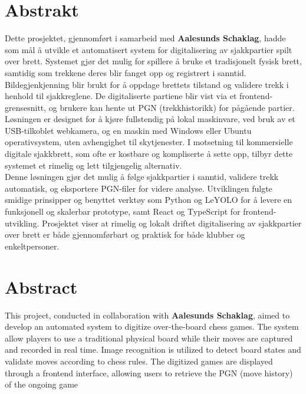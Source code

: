 \chapter*{Abstrakt}

Dette prosjektet, gjennomført i samarbeid med \textbf{Aalesunds Schaklag}, hadde som mål å utvikle et automatisert system for digitalisering av sjakkpartier spilt over brett. Systemet gjør det mulig for spillere å bruke et tradisjonelt fysisk brett, samtidig som trekkene deres blir fanget opp og registrert i sanntid. Bildegjenkjenning blir brukt for å oppdage brettets tilstand og validere trekk i henhold til sjakkreglene. De digitaliserte partiene blir vist via et frontend-grensesnitt, og brukere kan hente ut PGN (trekkhistorikk) for pågående partier. \\

Løsningen er designet for å kjøre fullstendig på lokal maskinvare, ved bruk av et USB-tilkoblet webkamera, og en maskin med Windows eller Ubuntu operativsystem, uten avhengighet til skytjenester. I motsetning til kommersielle digitale sjakkbrett, som ofte er kostbare og kompliserte å sette opp, tilbyr dette systemet et rimelig og lett tilgjengelig alternativ. \\

Denne løsningen gjør det mulig å følge sjakkpartier i sanntid, validere trekk automatisk, og eksportere PGN-filer for videre analyse. Utviklingen fulgte smidige prinsipper og benyttet verktøy som Python og LeYOLO for å levere en funksjonell og skalerbar prototype, samt React og TypeScript for frontend-utvikling. Prosjektet viser at rimelig og lokalt driftet digitalisering av sjakkpartier over brett er både gjennomførbart og praktisk for både klubber og enkeltpersoner.

\chapter*{Abstract}
This project, conducted in collaboration with \textbf{Aalesunds Schaklag}, aimed to develop an automated system to digitize over-the-board chess games. The system allow players to use a traditional physical board while their moves are captured and recorded in real time. Image recognition is utilized to detect board states and validate moves according to chess rules. The digitized games are displayed through a frontend interface, allowing users to retrieve the PGN (move history) of the ongoing game \\

